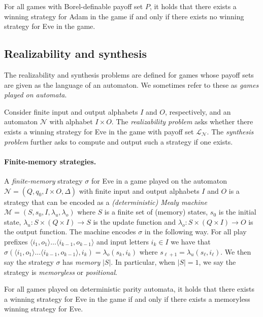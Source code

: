 \documentclass[runningheads,a4paper,draft]{llncs}
\newcommand{\eve}{Eve\xspace}
\newcommand{\adam}{Adam\xspace}
\newcommand{\calN}{\mathcal{N}}
\newcommand{\calM}{\mathcal{M}}
\newcommand{\lang}[1]{\mathcal{L}_{#1}}
\begin{document}
\begin{proposition}
  For all games with Borel-definable payoff set $P$, it holds that there
  exists a winning strategy for \adam in the game if and only if there exists
  no winning strategy for \eve in the game.
\end{proposition}

\subsection{Realizability and synthesis}
The realizability and synthesis problems are defined for games whose payoff sets
are given as the language of an automaton. We sometimes refer to these as
\emph{games played on automata}.
\begin{definition}[Problems]
  Consider finite input and output alphabets $I$ and $O$, respectively, and
  an automaton $\calN$ with alphabet $I \times O$.
  The \emph{realizability problem} asks whether
  there exists a winning strategy for \eve in the game with payoff set 
  $\lang{\calN}$. The \emph{synthesis problem}
  further asks to compute and output such a strategy if one exists.
\end{definition}

\paragraph{Finite-memory strategies.}
A \emph{finite-memory} strategy $\sigma$ for \eve in a game played on the
automaton $\calN =
(Q,q_0,I \times O,\Delta)$ with finite input and
output alphabets $I$ and $O$ is a strategy that can be encoded as a
\emph{(deterministic) Mealy machine} $\calM = (S,s_0,I, \lambda_u,\lambda_o)$
where $S$ is a finite set of (memory) states, $s_0$ is the initial state,
$\lambda_u : S \times (Q \times I) \to S$ is the update function and $\lambda_o
: S \times (Q \times I) \to O$ is the output function. The machine encodes
$\sigma$ in the following way. For all play prefixes $\langle i_1,  o_1\rangle
\dots \langle i_{k-1}, o_{k-1} \rangle$ and input letters $i_k \in I$ we have
that $\sigma(\langle i_1, o_1\rangle \dots \langle i_{k-1}, o_{k-1} \rangle,
i_k) = \lambda_o(s_k,i_k)$ where $s_{\ell + 1} =
\lambda_u(s_\ell,i_\ell)$. We then say the strategy $\sigma$ has \emph{memory}
$|S|$. In particular, when $|S| = 1$, we say the strategy is \emph{memoryless}
or \emph{positional}.

\begin{proposition}
  For all games played on deterministic parity automata, it holds that there
  exists a winning strategy for \eve in the game if and only if there exists a
  memoryless winning strategy for \eve.
\end{proposition}
\end{document}
